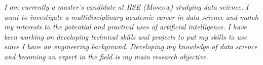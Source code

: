 

\begin{cvparagraph}


{\slshape I am currently a master's candidate at HSE (Moscow) studying data science. I want to investigate a multidisciplinary academic career in data science and match my interests to the potential and practical uses of artificial intelligence. I have been working on developing technical skills and projects to put my skills to use since I have an engineering background. Developing my knowledge of data science and becoming an expert in the field is my main research objective.}


\end{cvparagraph}
